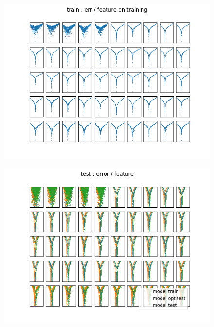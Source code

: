 \documentclass{article}
\begin{document}
\begin{figure}
\includegraphics[scale=1]{train_error_par_feature.png}
\end{figure}

\newpage

\begin{figure}
\includegraphics[scale=1]{test_error_par_feature.png}
\end{figure}

\newpage
\end{document}
